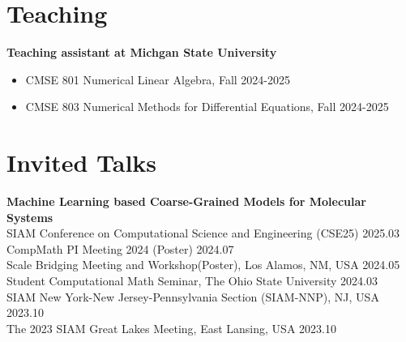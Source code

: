 \documentclass[letterpaper,10.8pt]{article}
\begin{document}
\section{Teaching}


\textbf{\color{MSLightBlue}Teaching assistant at Michgan State University}
\begin{itemize}
    \item CMSE 801 Numerical Linear Algebra, Fall 2024-2025
    \item CMSE 803 Numerical Methods for Differential Equations, Fall 2024-2025 
\end{itemize}








\section{Invited Talks}
\textbf{\color{MSLightBlue} Machine Learning based Coarse-Grained Models for Molecular Systems}
\\
SIAM Conference on Computational Science and Engineering (CSE25) \hfill 2025.03\\
CompMath PI Meeting 2024 (Poster) \hfill 2024.07\\
Scale Bridging Meeting and Workshop(Poster), Los Alamos, NM, USA \hfill 2024.05\\
Student Computational Math Seminar, The Ohio State University
\hfill  2024.03\\
SIAM New York-New Jersey-Pennsylvania Section (SIAM-NNP), NJ, USA \hfill 2023.10\\
The 2023 SIAM Great Lakes Meeting, East Lansing, USA  \hfill 2023.10 \\
\end{document}
